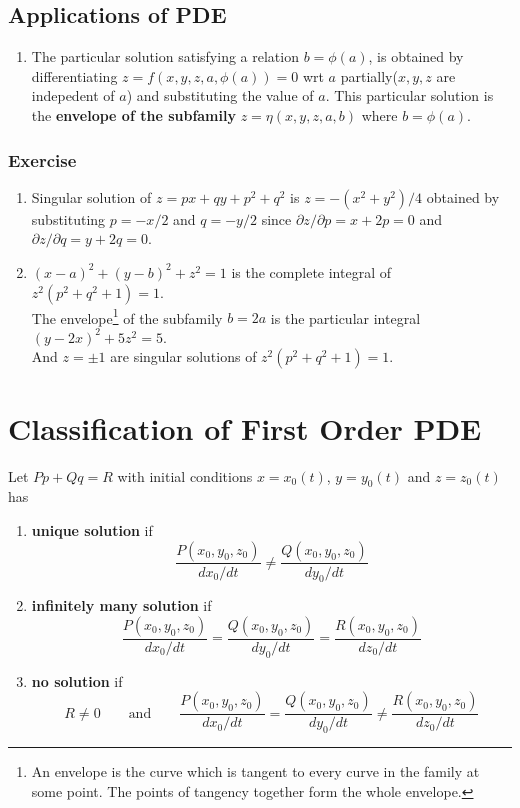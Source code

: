 \subsection{Applications of PDE}
\begin{enumerate}
	\item The particular solution satisfying a relation  $b = \phi(a)$, is obtained by differentiating $z= f(x,y,z,a,\phi(a)) = 0$ wrt $a$ partially($x,y,z$ are indepedent of $a$) and substituting the value of $a$. This particular solution is the \textbf{envelope of the subfamily} $z = \eta(x,y,z,a,b)$ where $b=\phi(a)$.
\end{enumerate}

\subsubsection*{Exercise}
\begin{enumerate}
	\item Singular solution of $z = px + qy + p^2 + q^2$ is $z = -(x^2+y^2)/4$ obtained by substituting $p = -x/2$ and $q = -y/2$ since $\partial z/\partial p = x + 2p = 0$ and $\partial z/\partial q = y + 2q = 0$.
	\item $(x-a)^2 + (y-b)^2 + z^2 = 1$ is the complete integral of $z^2(p^2+q^2+1) = 1$. \\
	The envelope\footnote{An envelope is the curve which is tangent to every curve in the family at some point. The points of tangency together form the whole envelope.} of the subfamily $b = 2a$ is  the particular integral $(y-2x)^2+5z^2 = 5$.\\
	And $z = \pm 1$ are singular solutions of $z^2(p^2+q^2+1) = 1$.
\end{enumerate}

\section{Classification of First Order PDE}
Let $Pp + Qq = R$ with initial conditions $x = x_0(t)$, $y = y_0(t)$ and $z = z_0(t)$ has
\begin{enumerate}
	\item \textbf{unique solution} if $$\frac{P(x_0,y_0,z_0)}{dx_0/dt} \ne \frac{Q(x_0,y_0,z_0)}{dy_0/dt}$$
	\item \textbf{infinitely many solution} if $$\frac{P(x_0,y_0,z_0)}{dx_0/dt} = \frac{Q(x_0,y_0,z_0)}{dy_0/dt} = \frac{R(x_0,y_0,z_0)}{dz_0/dt}$$
	\item \textbf{no solution} if $$R \ne 0 \qquad \text{and}\qquad \frac{P(x_0,y_0,z_0)}{dx_0/dt} = \frac{Q(x_0,y_0,z_0)}{dy_0/dt} \ne \frac{R(x_0,y_0,z_0)}{dz_0/dt}$$
\end{enumerate}

